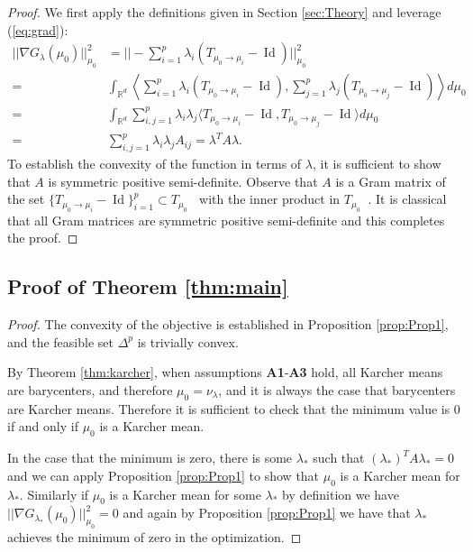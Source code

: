 \documentclass[nohyperref]{article}
\DeclareMathOperator*{\id}{Id}
\DeclareMathOperator{\Pac}{\mathcal{P}_{2,ac}(\mathbb{R}^d)}
\theoremstyle{definition}
\begin{document}
\begin{proof}
    We first apply the definitions given in Section \ref{sec:Theory} and leverage (\ref{eq:grad}):
    \begin{align*}
        ||\nabla G_{\lambda}(\mu_0)||_{\mu_0}^2 &= ||-\sum_{i=1}^p \lambda_i (T_{\mu_0\rightarrow\mu_i} - \id)||_{\mu_0}^2 \\
        = &\int_{\mathbb{R}^d} \left \langle \sum_{i=1}^p \lambda_i (T_{\mu_0\rightarrow\mu_i} - \id), \sum_{j=1}^p \lambda_j (T_{\mu_0\rightarrow\mu_j} - \id)  \right \rangle d\mu_0 \\
        = &\int_{\mathbb{R}^d} \sum_{i,j=1}^p \lambda_i \lambda_j \langle T_{\mu_0\rightarrow\mu_i} - \id, T_{\mu_0\rightarrow\mu_j} - \id\rangle d\mu_0\\
        = &\sum_{i,j=1}^{p} \lambda_i\lambda_j A_{ij} = \lambda^TA\lambda.
    \end{align*}
    To establish the convexity of the function in terms of $\lambda$, it is sufficient to show that $A$ is symmetric positive semi-definite. Observe that $A$ is a Gram matrix of the set $\{T_{\mu_0\rightarrow\mu_i} - \id\}_{i=1}^p \subset T_{\mu_0}\Pac$ with the inner product in $T_{\mu_0}\Pac$. It is classical that all Gram matrices are symmetric positive semi-definite \citep{schwerdtfeger1961introduction} and this completes the proof.
\end{proof}

\subsection{Proof of Theorem \ref{thm:main}}\label{SM:Thm1Proof}

\begin{proof}
    The convexity of the objective is established in Proposition \ref{prop:Prop1}, and the feasible set $\Delta^p$ is trivially convex. 
    
    By Theorem \ref{thm:karcher}, when assumptions \textbf{A1}-\textbf{A3} hold, all Karcher means are barycenters, and therefore $\mu_0 = \nu_{\lambda}$, and it is always the case that barycenters are Karcher means. Therefore it is sufficient to check that the minimum value is 0 if and only if $\mu_0$ is a Karcher mean.
    
    In the case that the minimum is zero, there is some $\lambda_*$ such that $(\lambda_*)^TA\lambda_* = 0$ and we can apply Proposition \ref{prop:Prop1} to show that $\mu_0$ is a Karcher mean for $\lambda_*$. 
    Similarly if $\mu_0$ is a Karcher mean for some $\lambda_*$ by definition we have $||\nabla G_{\lambda_*}(\mu_0)||_{\mu_0}^2 = 0$ and again by Proposition \ref{prop:Prop1} we have that $\lambda_*$ achieves the minimum of zero in the optimization.
\end{proof}
\end{document}
